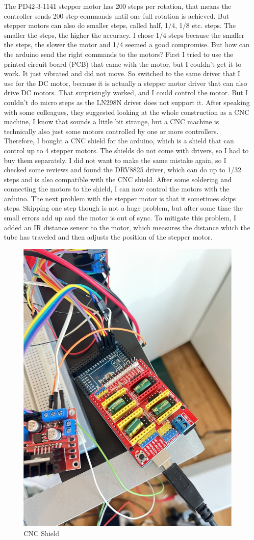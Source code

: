 The PD42-3-1141 stepper motor has 200 steps per rotation, that means the controller sends 200 step-commands until one full rotation is achieved.
But stepper motors can also do smaller steps, called half, 1/4, 1/8 etc. steps.
The smaller the steps, the higher the accuracy.
I chose 1/4 steps because the smaller the steps, the slower the motor and 1/4 seemed a good compromise.
But how can the arduino send the right commands to the motors?
First I tried to use the printed circuit board (PCB) that came with the motor, but I couldn't get it to work.
It just vibrated and did not move.
So switched to the same driver that I use for the DC motor, because it is actually a stepper motor driver that can also drive DC motors.
That surprisingly worked, and I could control the motor.
But I couldn't do micro steps as the LN298N driver does not support it.
After speaking with some colleagues, they suggested looking at the whole construction as a CNC machine, I know that sounds a little bit strange, but a CNC machine is technically also just some motors controlled by one or more controllers.
Therefore, I bought a CNC shield\autocite{cnc-shield} for the arduino, which is a shield that can control up to 4 stepper motors.
The shields do not come with drivers, so I had to buy them separately.
I did not want to make the same mistake again, so I checked some reviews and found the DRV8825\autocite{drv8825} driver, which can do up to 1/32 steps and is also compatible with the CNC shield.
After some soldering and connecting the motors to the shield, I can now control the motors with the arduino.
The next problem with the stepper motor is that it sometimes skips steps.
Skipping one step though is not a huge problem, but after some time the small errors add up and the motor is out of sync.
To mitigate this problem, I added an IR distance sensor to the motor, which measures the distance which the tube has traveled and then adjusts the position of the stepper motor.
\begin{figure}[H]
    \centering
    \includegraphics[width=.3\linewidth]{../photos/cnc_shield}
    \caption{CNC Shield}
    \label{fig:cnc_shield}
\end{figure}
